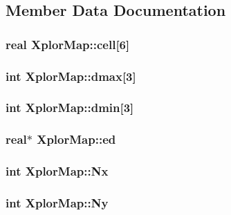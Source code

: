 \subsection{\-Member \-Data \-Documentation}
\hypertarget{structXplorMap_a29f13ed5853fe553b8c5be57712e0b5c}{
\subsubsection[{cell}]{\setlength{\rightskip}{0pt plus 5cm}real {\bf \-Xplor\-Map\-::cell}\mbox{[}6\mbox{]}}}\label{structXplorMap_a29f13ed5853fe553b8c5be57712e0b5c}
\hypertarget{structXplorMap_aafc111087d5d94db0bf38dbb7d436c8a}{
\subsubsection[{dmax}]{\setlength{\rightskip}{0pt plus 5cm}int {\bf \-Xplor\-Map\-::dmax}\mbox{[}3\mbox{]}}}\label{structXplorMap_aafc111087d5d94db0bf38dbb7d436c8a}
\hypertarget{structXplorMap_aff26faac26bfb8d72363e95503d8cae3}{
\subsubsection[{dmin}]{\setlength{\rightskip}{0pt plus 5cm}int {\bf \-Xplor\-Map\-::dmin}\mbox{[}3\mbox{]}}}\label{structXplorMap_aff26faac26bfb8d72363e95503d8cae3}
\hypertarget{structXplorMap_a3d8eea31f1ca7c8a1f3a1f6d1d0651d8}{
\subsubsection[{ed}]{\setlength{\rightskip}{0pt plus 5cm}real$\ast$ {\bf \-Xplor\-Map\-::ed}}}\label{structXplorMap_a3d8eea31f1ca7c8a1f3a1f6d1d0651d8}
\hypertarget{structXplorMap_a4b03957f675c24cec49bdb5df65f046b}{
\subsubsection[{\-Nx}]{\setlength{\rightskip}{0pt plus 5cm}int {\bf \-Xplor\-Map\-::\-Nx}}}\label{structXplorMap_a4b03957f675c24cec49bdb5df65f046b}
\hypertarget{structXplorMap_ad5098bc70c377d0cc387cb7b894337e5}{
\subsubsection[{\-Ny}]{\setlength{\rightskip}{0pt plus 5cm}int {\bf \-Xplor\-Map\-::\-Ny}}}\label{structXplorMap_ad5098bc70c377d0cc387cb7b894337e5}
